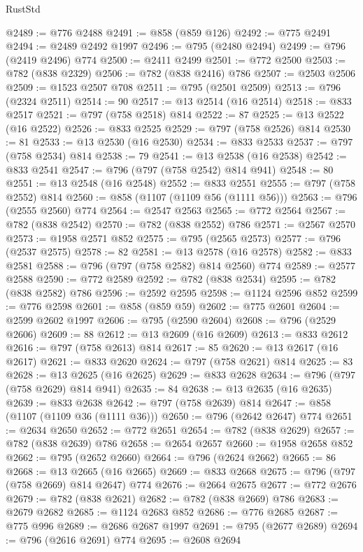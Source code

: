 \begin{lexlean}{RustStd}
\begin{coremodule}
{\begin{coremodule}
{{{{{{{{{{{{{{@2489 := @776 @2488
@2491 := @858 (@859 @126)
@2492 := @775 @2491
@2494 := @2489 @2492 @1997
@2496 := @795 (@2480 @2494)
@2499 := @796 (@2419 @2496) @774
@2500 := @2411 @2499
@2501 := @772 @2500
@2503 := @782 (@838 @2329)
@2506 := @782 (@838 @2416) @786
@2507 := @2503 @2506
@2509 := @1523 @2507 @708
@2511 := @795 (@2501 @2509)
@2513 := @796 (@2324 @2511)
@2514 := 90
@2517 := @13 @2514 (@16 @2514)
@2518 := @833 @2517
@2521 := @797 (@758 @2518) @814
@2522 := 87
@2525 := @13 @2522 (@16 @2522)
@2526 := @833 @2525
@2529 := @797 (@758 @2526) @814
@2530 := 81
@2533 := @13 @2530 (@16 @2530)
@2534 := @833 @2533
@2537 := @797 (@758 @2534) @814
@2538 := 79
@2541 := @13 @2538 (@16 @2538)
@2542 := @833 @2541
@2547 := @796 (@797 (@758 @2542) @814 @941)
@2548 := 80
@2551 := @13 @2548 (@16 @2548)
@2552 := @833 @2551
@2555 := @797 (@758 @2552) @814
@2560 := @858 (@1107 (@1109 @56 (@1111 @56)))
@2563 := @796 (@2555 @2560) @774
@2564 := @2547 @2563
@2565 := @772 @2564
@2567 := @782 (@838 @2542)
@2570 := @782 (@838 @2552) @786
@2571 := @2567 @2570
@2573 := @1958 @2571 @852
@2575 := @795 (@2565 @2573)
@2577 := @796 (@2537 @2575)
@2578 := 82
@2581 := @13 @2578 (@16 @2578)
@2582 := @833 @2581
@2588 := @796 (@797 (@758 @2582) @814 @2560) @774
@2589 := @2577 @2588
@2590 := @772 @2589
@2592 := @782 (@838 @2534)
@2595 := @782 (@838 @2582) @786
@2596 := @2592 @2595
@2598 := @1124 @2596 @852
@2599 := @776 @2598
@2601 := @858 (@859 @59)
@2602 := @775 @2601
@2604 := @2599 @2602 @1997
@2606 := @795 (@2590 @2604)
@2608 := @796 (@2529 @2606)
@2609 := 88
@2612 := @13 @2609 (@16 @2609)
@2613 := @833 @2612
@2616 := @797 (@758 @2613) @814
@2617 := 85
@2620 := @13 @2617 (@16 @2617)
@2621 := @833 @2620
@2624 := @797 (@758 @2621) @814
@2625 := 83
@2628 := @13 @2625 (@16 @2625)
@2629 := @833 @2628
@2634 := @796 (@797 (@758 @2629) @814 @941)
@2635 := 84
@2638 := @13 @2635 (@16 @2635)
@2639 := @833 @2638
@2642 := @797 (@758 @2639) @814
@2647 := @858 (@1107 (@1109 @36 (@1111 @36)))
@2650 := @796 (@2642 @2647) @774
@2651 := @2634 @2650
@2652 := @772 @2651
@2654 := @782 (@838 @2629)
@2657 := @782 (@838 @2639) @786
@2658 := @2654 @2657
@2660 := @1958 @2658 @852
@2662 := @795 (@2652 @2660)
@2664 := @796 (@2624 @2662)
@2665 := 86
@2668 := @13 @2665 (@16 @2665)
@2669 := @833 @2668
@2675 := @796 (@797 (@758 @2669) @814 @2647) @774
@2676 := @2664 @2675
@2677 := @772 @2676
@2679 := @782 (@838 @2621)
@2682 := @782 (@838 @2669) @786
@2683 := @2679 @2682
@2685 := @1124 @2683 @852
@2686 := @776 @2685
@2687 := @775 @996
@2689 := @2686 @2687 @1997
@2691 := @795 (@2677 @2689)
@2694 := @796 (@2616 @2691) @774
@2695 := @2608 @2694
}}}}}}}}}}}}}}
\end{coremodule}}
\end{coremodule}
\end{lexlean}

